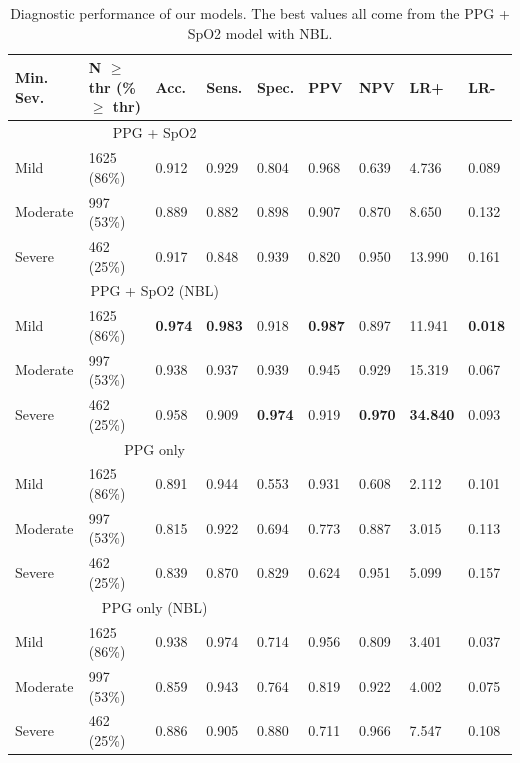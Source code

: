 \renewcommand{\arraystretch}{1.5}
\begin{table}
    \centering
    \begin{tabular}{ p{1.5cm} p{2cm} p{1cm} p{1cm} p{1cm} p{1cm} p{1cm} p{1cm} p{1cm} }
        Min. \newline Sev. & N $\geq$ thr \newline (\% $\geq$ thr)  & Acc. & Sens. & Spec. & PPV & NPV & LR+ & LR- \\
        \hline
        \hline
        \multicolumn{5}{c}{PPG + SpO2} \\
        \hline
        Mild & 1625 (86\%) & 0.912 & 0.929 & 0.804 & 0.968 & 0.639 & 4.736 & 0.089 \\
        Moderate & 997 (53\%) & 0.889 & 0.882 & 0.898 & 0.907 & 0.870 & 8.650 & 0.132 \\
        Severe & 462 (25\%) & 0.917 & 0.848 & 0.939 & 0.820 & 0.950 & 13.990 & 0.161 \\
        \hline
        \multicolumn{5}{c}{PPG + SpO2 (NBL)} \\
        \hline
        Mild & 1625 (86\%) & \textbf{0.974} & \textbf{0.983} & 0.918 & \textbf{0.987} & 0.897 & 11.941 & \textbf{0.018} \\
        Moderate & 997 (53\%) & 0.938 & 0.937 & 0.939 & 0.945 & 0.929 & 15.319 & 0.067 \\
        Severe & 462 (25\%) & 0.958 & 0.909 & \textbf{0.974} & 0.919 & \textbf{0.970} & \textbf{34.840} & 0.093 \\
        \hline
        \hline
        \multicolumn{5}{c}{PPG only} \\
        \hline
        Mild & 1625 (86\%) & 0.891 & 0.944 & 0.553 & 0.931 & 0.608 & 2.112 & 0.101 \\
        Moderate & 997 (53\%) & 0.815 & 0.922 & 0.694 & 0.773 & 0.887 & 3.015 & 0.113 \\
        Severe & 462 (25\%) & 0.839 & 0.870 & 0.829 & 0.624 & 0.951 & 5.099 & 0.157 \\
        \hline
        \multicolumn{5}{c}{PPG only (NBL)} \\
        \hline
        Mild & 1625 (86\%) & 0.938 & 0.974 & 0.714 & 0.956 & 0.809 & 3.401 & 0.037 \\
        Moderate & 997 (53\%) & 0.859 & 0.943 & 0.764 & 0.819 & 0.922 & 4.002 & 0.075 \\
        Severe & 462 (25\%) & 0.886 & 0.905 & 0.880 & 0.711 & 0.966 & 7.547 & 0.108 \\
    \end{tabular}
    \caption{Diagnostic performance of our models. The best values all come from the PPG + SpO2 model with NBL. \label{tab:severity-class-level-metrics}}
\end{table}

